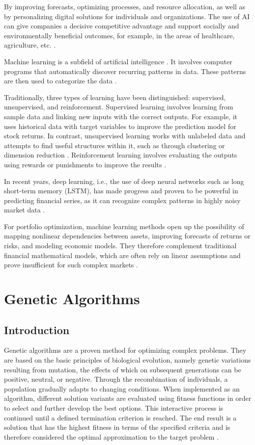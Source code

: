 \documentclass{agasthesis}
\begin{document}
By improving forecasts, optimizing processes, and resource allocation, as well as by personalizing digital solutions for individuals and organizations. 
The use of AI can give companies a decisive competitive advantage and support socially and environmentally beneficial outcomes, 
for example, in the areas of healthcare, agriculture, etc. \cite{radley-gardner_fundamental_2016}.

Machine learning is a subfield of artificial intelligence \cite[p. 19]{russell_artificial_2022}. It involves computer programs that automatically discover recurring patterns in data. 
These patterns are then used to categorize the data \cite[p. 1]{bishop_pattern_2006}.

Traditionally, three types of learning have been distinguished: supervised, unsupervised, and reinforcement. 
Supervised learning involves learning from sample data and linking new inputs with the correct outputs. 
For example, it uses historical data with target variables to improve the prediction model for stock returns. 
In contrast, unsupervised learning works with unlabeled data and attempts to find useful structures within it, such as through clustering or dimension reduction \cite{goodfellow_generative_2020}. 
Reinforcement learning involves evaluating the outputs using rewards or punishments to improve the results \cite{stiennon_learning_2020}.

In recent years, deep learning, i.e., the use of deep neural networks such as long short-term memory (LSTM), 
has made progress and proven to be powerful in predicting financial series, as it can recognize complex patterns in highly noisy market data \cite{fischer_deep_2018}.

For portfolio optimization, machine learning methods open up the possibility of mapping nonlinear dependencies between assets, 
improving forecasts of returns or risks, and modeling economic models. They therefore complement traditional financial mathematical models, 
which are often rely on linear assumptions and prove insufficient for such complex markets \cite{gu_empirical_2020}.

\section{Genetic Algorithms}
\subsection{Introduction}
Genetic algorithms are a proven method for optimizing complex problems. They are based on the basic principles of biological evolution, 
namely genetic variations resulting from mutation, the effects of which on subsequent generations can be positive, neutral, or negative. 
Through the recombination of individuals, a population gradually adapts to changing conditions. When implemented as an algorithm, 
different solution variants are evaluated using fitness functions in order to select and further develop the best options. 
This interactive process is continued until a defined termination criterion is reached. 
The end result is a solution that has the highest fitness in terms of the specified criteria and is therefore considered the optimal approximation to the target problem \cite[p. 203]{soldatos_big_2022}.
\end{document}
